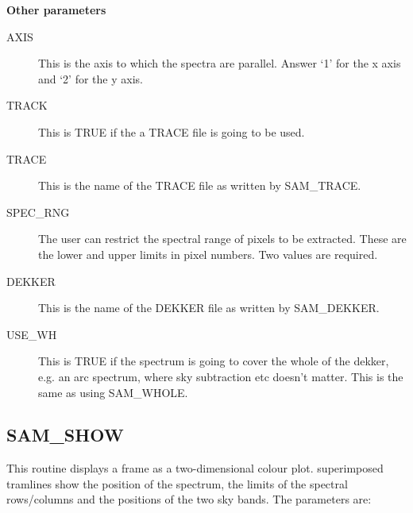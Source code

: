 {\bf Other parameters}

\begin{description}

\item[AXIS] This is the axis to which the spectra are parallel.  Answer `1' for
the x axis and `2' for the y axis.

\item[TRACK] This is TRUE if the a TRACE file is going to be used.

\item[TRACE] This is the name of the TRACE file as written by SAM\_TRACE.

\item[SPEC\_RNG] The user can restrict the spectral range of pixels to be
extracted. These are the lower and upper limits in pixel numbers.  Two values
are required.

\item[DEKKER] This is the name of the DEKKER file as written by SAM\_DEKKER.

\item[USE\_WH] This is TRUE if the spectrum is going to cover the whole of the
dekker, e.g. an arc spectrum, where sky subtraction etc doesn't matter.  This
is the same as using SAM\_WHOLE.

\end{description}

\subsection{SAM\_SHOW}

This routine displays a frame as a two-dimensional colour plot. superimposed
tramlines show the position of the spectrum, the limits of the spectral
rows/columns and the positions of the two sky bands.  The parameters are:

